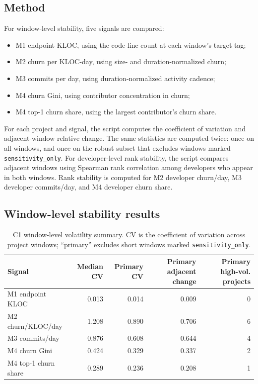 \subsection{Method}
\label{sec:c1_method}

For window-level stability, five signals are compared:
\begin{itemize}[leftmargin=*]
  \item M1 endpoint KLOC, using the code-line count at each window's target tag;
  \item M2 churn per KLOC-day, using size- and duration-normalized churn;
  \item M3 commits per day, using duration-normalized activity cadence;
  \item M4 churn Gini, using contributor concentration in churn;
  \item M4 top-1 churn share, using the largest contributor's churn share.
\end{itemize}

For each project and signal, the script computes the coefficient of variation and adjacent-window relative
change. The same statistics are computed twice: once on all windows, and once on the robust subset that excludes
windows marked \texttt{sensitivity\_only}. For developer-level rank stability, the script compares adjacent
windows using Spearman rank correlation among developers who appear in both windows. Rank stability is computed
for M2 developer churn/day, M3 developer commits/day, and M4 developer churn share.

\subsection{Window-level stability results}
\label{sec:c1_window_results}

\begin{table}[H]
\centering
\scriptsize
\renewcommand{\arraystretch}{1.08}
\begin{tabular}{p{3.9cm}rrrr}
\toprule
\textbf{Signal} & \textbf{Median CV} & \textbf{Primary CV} & \textbf{Primary adjacent change} & \textbf{Primary high-vol. projects} \\
\midrule
M1 endpoint KLOC & 0.013 & 0.014 & 0.009 & 0 \\
M2 churn/KLOC/day & 1.208 & 0.890 & 0.706 & 6 \\
M3 commits/day & 0.876 & 0.608 & 0.644 & 4 \\
M4 churn Gini & 0.424 & 0.329 & 0.337 & 2 \\
M4 top-1 churn share & 0.289 & 0.236 & 0.208 & 1 \\
\bottomrule
\end{tabular}
\caption{C1 window-level volatility summary. CV is the coefficient of variation across project windows; ``primary'' excludes short windows marked \texttt{sensitivity\_only}.}
\label{tab:c1_window_stability_summary}
\end{table}

